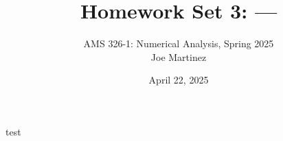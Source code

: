 \documentclass{article}
\title{Homework Set 3: ---}
\author{
AMS 326-1: Numerical Analysis, Spring 2025 \\
Joe Martinez
}
\date{April 22, 2025}
\begin{document}
\maketitle
test
\end{document}
